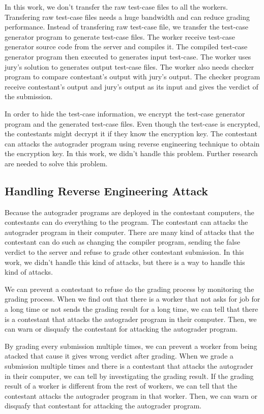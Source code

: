 \documentclass[conference]{IEEEtran}
\begin{document}
In this work, we don't transfer the raw test-case files to all the workers. Transfering raw test-case files needs a huge bandwidth and can reduce grading performance. Instead of transfering raw test-case file, we transfer the test-case generator program to generate test-case files. The worker receive test-case generator source code from the server and compiles it. The compiled test-case generator program then executed to generates input test-case. The worker uses jury's solution to generates output test-case files. The worker also needs checker program to compare contestant's output with jury's output. The checker program receive contestant's output and jury's output as its input and gives the verdict of the submission.

In order to hide the test-case information, we encrypt the test-case generator program and the generated test-case files. Even though the test-case is encrypted, the contestants might decrypt it if they know the encryption key. The contestant can attacks the autograder program using reverse engineering technique to obtain the encryption key. In this work, we didn't handle this problem. Further research are needed to solve this problem.

\subsection{Handling Reverse Engineering Attack}

Because the autograder programs are deployed in the contestant computers, the contestants can do everything to the program. The contestant can attacks the autograder program in their computer. There are many kind of attacks that the contestant can do such as changing the compiler program, sending the false verdict to the server and refuse to grade other contestant submission. In this work, we didn't handle this kind of attacks, but there is a way to handle this kind of attacks.

We can prevent a contestant to refuse do the grading process by monitoring the grading process. When we find out that there is a worker that not asks for job for a long time or not sends the grading result for a long time, we can tell that there is a contestant that attacks the autograder program in their computer. Then, we can warn or disquafy the contestant for attacking the autograder program.

By grading every submission multiple times, we can prevent a worker from being atacked that cause it gives wrong verdict after grading. When we grade a submission multiple times and there is a contestant that attacks the autograder in their computer, we can tell by investigating the grading result. If the grading result of a worker is different from the rest of workers, we can tell that the contestant attacks the autograder program in that worker. Then, we can warn or disquafy that contestant for attacking the autograder program.
\end{document}
